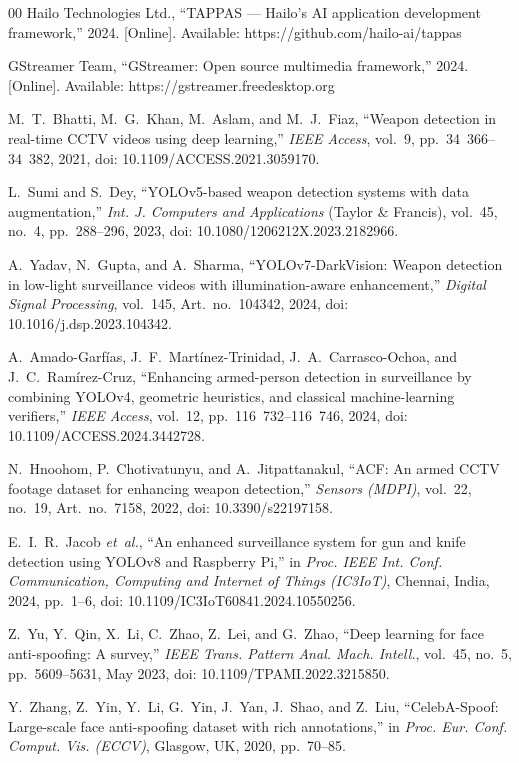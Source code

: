 \documentclass{ieeeaccess}
\begin{document}
\begin{thebibliography}{00}
 Hailo Technologies Ltd., ``TAPPAS --- Hailo's AI application development framework,'' 2024. [Online]. Available: https://github.com/hailo-ai/tappas

 GStreamer Team, ``GStreamer: Open source multimedia framework,'' 2024. [Online]. Available: https://gstreamer.freedesktop.org

 M.~T.~Bhatti, M.~G.~Khan, M.~Aslam, and M.~J.~Fiaz, ``Weapon detection in real-time CCTV videos using deep learning,'' \emph{IEEE Access}, vol.~9, pp.~34~366--34~382, 2021, doi: 10.1109/ACCESS.2021.3059170.

 L.~Sumi and S.~Dey, ``YOLOv5-based weapon detection systems with data augmentation,'' \emph{Int. J. Computers and Applications} (Taylor \& Francis), vol.~45, no.~4, pp.~288--296, 2023, doi: 10.1080/1206212X.2023.2182966.

 A.~Yadav, N.~Gupta, and A.~Sharma, ``YOLOv7-DarkVision: Weapon detection in low-light surveillance videos with illumination-aware enhancement,'' \emph{Digital Signal Processing}, vol.~145, Art.~no.~104342, 2024, doi: 10.1016/j.dsp.2023.104342.

 A.~Amado-Garf\'{i}as, J.~F.~Mart\'{i}nez-Trinidad, J.~A.~Carrasco-Ochoa, and J.~C.~Ram\'{i}rez-Cruz, ``Enhancing armed-person detection in surveillance by combining YOLOv4, geometric heuristics, and classical machine-learning verifiers,'' \emph{IEEE Access}, vol.~12, pp.~116~732--116~746, 2024, doi: 10.1109/ACCESS.2024.3442728.

 N.~Hnoohom, P.~Chotivatunyu, and A.~Jitpattanakul, ``ACF: An armed CCTV footage dataset for enhancing weapon detection,'' \emph{Sensors (MDPI)}, vol.~22, no.~19, Art.~no.~7158, 2022, doi: 10.3390/s22197158.

 E.~I.~R.~Jacob \emph{et~al.}, ``An enhanced surveillance system for gun and knife detection using YOLOv8 and Raspberry Pi,'' in \emph{Proc. IEEE Int. Conf. Communication, Computing and Internet of Things (IC3IoT)}, Chennai, India, 2024, pp.~1--6, doi: 10.1109/IC3IoT60841.2024.10550256.

 Z.~Yu, Y.~Qin, X.~Li, C.~Zhao, Z.~Lei, and G.~Zhao, ``Deep learning for face anti-spoofing: A survey,'' \emph{IEEE Trans. Pattern Anal. Mach. Intell.}, vol.~45, no.~5, pp.~5609--5631, May 2023, doi: 10.1109/TPAMI.2022.3215850.

 Y.~Zhang, Z.~Yin, Y.~Li, G.~Yin, J.~Yan, J.~Shao, and Z.~Liu, ``CelebA-Spoof: Large-scale face anti-spoofing dataset with rich annotations,'' in \emph{Proc. Eur. Conf. Comput. Vis. (ECCV)}, Glasgow, UK, 2020, pp.~70--85.


\end{thebibliography}
\end{document}
